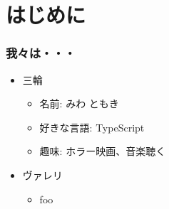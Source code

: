 \section{はじめに}
\begin{frame}
    \frametitle{我々は・・・}
    \begin{itemize}
        \item<4-> 三輪
        \begin{itemize}
            \item<5-> 名前: みわ ともき
            \item<6-> 好きな言語: TypeScript
            \item<7-> 趣味: ホラー映画、音楽聴く
        \end{itemize}
        \item<8-> ヴァレリ
        \begin{itemize}
            \item<9-> foo
        \end{itemize}
    \end{itemize}
\end{frame}
